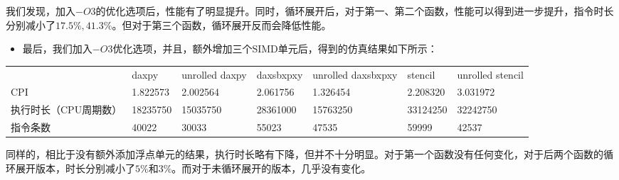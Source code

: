 \documentclass[english]{ctexart}
\providecommand{\tabularnewline}{\\}
\begin{document}
我们发现，加入$-O3$的优化选项后，性能有了明显提升。同时，循环展开后，对于第一、第二个函数，性能可以得到进一步提升，指令时长分别减小了$17.5\%,41.3\%$。但对于第三个函数，循环展开反而会降低性能。
\begin{itemize}
\item 最后，我们加入$-O3$优化选项，并且，额外增加三个SIMD单元后，得到的仿真结果如下所示：
\end{itemize}
\begin{tabular}{lllllll}
 & daxpy & unrolled daxpy & daxsbxpxy & unrolled daxsbxpxy & stencil & unrolled stencil\tabularnewline
CPI & 1.822573 & 2.002564 & 2.061756 & 1.326454 & 2.208320 & 3.031972\tabularnewline
执行时长（CPU周期数） & 18235750 & 15035750 & 28361000 & 15763250 & 33124250 & 32242750\tabularnewline
指令条数 & 40022 & 30033 & 55023 & 47535 & 59999 & 42537\tabularnewline
\end{tabular}

同样的，相比于没有额外添加浮点单元的结果，执行时长略有下降，但并不十分明显。对于第一个函数没有任何变化，对于后两个函数的循环展开版本，时长分别减小了$5\%$和$3\%$。而对于未循环展开的版本，几乎没有变化。
\end{document}
